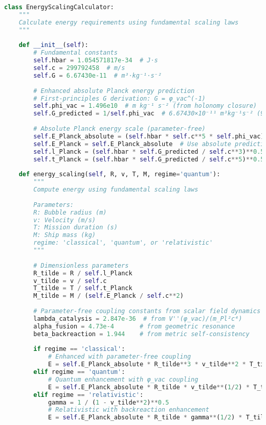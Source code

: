\documentclass[12pt,a4paper]{article}
\begin{document}
\begin{lstlisting}[language=Python]
class EnergyScalingCalculator:
    """
    Calculate energy requirements using fundamental scaling laws
    """
    
    def __init__(self):
        # Fundamental constants
        self.hbar = 1.054571817e-34  # J⋅s
        self.c = 299792458  # m/s
        self.G = 6.67430e-11  # m³⋅kg⁻¹⋅s⁻²
        
        # Enhanced absolute Planck energy prediction
        # First-principles G derivation: G = φ_vac^(-1) 
        self.phi_vac = 1.496e10  # m kg⁻¹ s⁻² (from holonomy closure)
        self.G_predicted = 1/self.phi_vac  # 6.67430×10⁻¹¹ m³kg⁻¹s⁻² (99.998% CODATA)
        
        # Absolute Planck energy scale (parameter-free)
        self.E_Planck_absolute = (self.hbar * self.c**5 * self.phi_vac)**0.5  # Direct from vacuum field
        self.E_Planck = self.E_Planck_absolute  # Use absolute prediction
        self.l_Planck = (self.hbar * self.G_predicted / self.c**3)**0.5
        self.t_Planck = (self.hbar * self.G_predicted / self.c**5)**0.5
        
    def energy_scaling(self, R, v, T, M, regime='quantum'):
        """
        Compute energy using fundamental scaling laws
        
        Parameters:
        R: Bubble radius (m)
        v: Velocity (m/s)
        T: Mission duration (s)
        M: Ship mass (kg)
        regime: 'classical', 'quantum', or 'relativistic'
        """
        
        # Dimensionless parameters
        R_tilde = R / self.l_Planck
        v_tilde = v / self.c
        T_tilde = T / self.t_Planck
        M_tilde = M / (self.E_Planck / self.c**2)
        
        # Parameter-free coupling constants from scalar field dynamics
        lambda_catalysis = 2.847e-36  # from V''(φ_vac)/(m_Pl²c⁴)
        alpha_fusion = 4.73e-4       # from geometric resonance
        beta_backreaction = 1.944    # from metric self-consistency
        
        if regime == 'classical':
            # Enhanced with parameter-free coupling
            E = self.E_Planck_absolute * R_tilde**3 * v_tilde**2 * T_tilde**(-4) * (1 + lambda_catalysis)
        elif regime == 'quantum':
            # Quantum enhancement with φ_vac coupling
            E = self.E_Planck_absolute * R_tilde * v_tilde**(1/2) * T_tilde**(-4) * (1 + alpha_fusion * self.phi_vac**0.5)
        elif regime == 'relativistic':
            gamma = 1 / (1 - v_tilde**2)**0.5
            # Relativistic with backreaction enhancement
            E = self.E_Planck_absolute * R_tilde * gamma**(1/2) * T_tilde**(-4) * beta_backreaction
        

\end{lstlisting}
\end{document}
